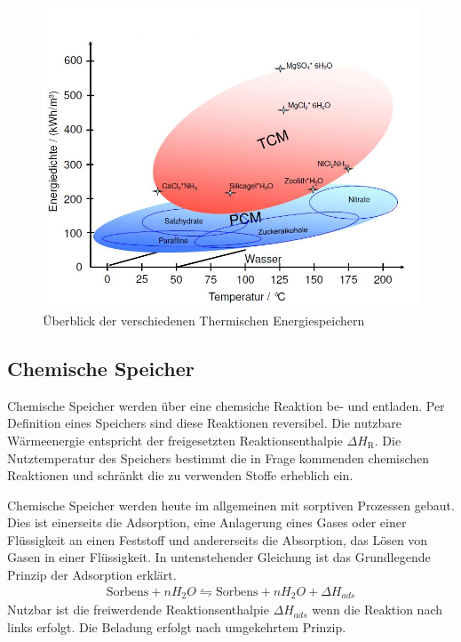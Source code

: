 \documentclass[11pt,a4paper]{scrartcl}
\begin{document}
\begin{figure}[h]
\begin{center}
\includegraphics[scale=0.5]{images/temperaturenergiedichte.jpg}
\caption{Überblick der verschiedenen Thermischen Energiespeichern \cite{zaebayern}}
\label{fig:temperaturenergiedichte}
\end{center}
\end{figure}

\subsection{Chemische Speicher}
Chemische Speicher werden über eine chemsiche Reaktion be- und entladen. Per
Definition eines Speichers sind diese Reaktionen reversibel. Die nutzbare
Wärmeenergie entspricht der freigesetzten Reaktionsenthalpie $\Delta
H_{\mathrm{R}}$. Die Nutztemperatur des Speichers bestimmt die in Frage
kommenden chemischen Reaktionen und schränkt die zu verwenden Stoffe erheblich
ein.

Chemische Speicher werden heute im allgemeinen mit sorptiven Prozessen gebaut.
Dies ist einerseits die Adsorption, eine Anlagerung eines Gases oder einer
Flüssigkeit an einen Feststoff und andererseits die Absorption, das Lösen von
Gasen in einer Flüssigkeit. In untenstehender Gleichung ist das Grundlegende
Prinzip der Adsorption erklärt.
\begin{align}
\text{Sorbens}+nH_2O\leftrightharpoons \text{Sorbens}+nH_2O+\Delta H_{ads}
\end{align}
Nutzbar ist die freiwerdende Reaktionsenthalpie $\Delta H_{ads}$ wenn die
Reaktion nach links erfolgt. Die Beladung erfolgt nach umgekehrtem Prinzip.  
\cite{Wesselak}
\end{document}
